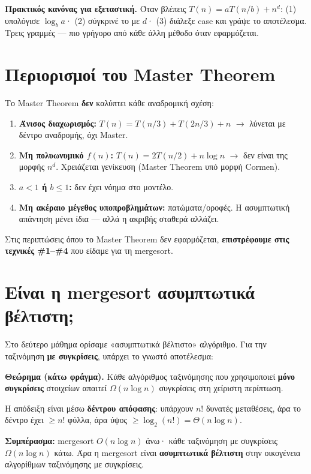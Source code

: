 \documentclass[11pt,a4paper]{article}
\begin{document}
\begin{keypoint}
\textbf{Πρακτικός κανόνας για εξεταστική.} Όταν βλέπεις $T(n) = a T(n/b) + n^d$:
(1) υπολόγισε $\log_b a$· (2) σύγκρινέ το με $d$· (3) διάλεξε case και γράψε το
αποτέλεσμα. Τρεις γραμμές --- πιο γρήγορο από κάθε άλλη μέθοδο όταν εφαρμόζεται.
\end{keypoint}

\section{Περιορισμοί του Master Theorem}

Το Master Theorem \textbf{δεν} καλύπτει κάθε αναδρομική σχέση:
\begin{enumerate}
  \item \textbf{Άνισος διαχωρισμός:} $T(n) = T(n/3) + T(2n/3) + n$ $\to$ λύνεται
  με δέντρο αναδρομής, όχι Master.
  \item \textbf{Μη πολυωνυμικό $f(n)$:} $T(n) = 2T(n/2) + n \log n$ $\to$ δεν
  είναι της μορφής $n^d$. Χρειάζεται γενίκευση (Master Theorem υπό μορφή Cormen).
  \item \textbf{$a < 1$ ή $b \le 1$:} δεν έχει νόημα στο μοντέλο.
  \item \textbf{Μη ακέραιο μέγεθος υποπροβλημάτων:} πατώματα/οροφές. Η
  ασυμπτωτική απάντηση μένει ίδια --- αλλά η ακριβής σταθερά αλλάζει.
\end{enumerate}
Στις περιπτώσεις όπου το Master Theorem δεν εφαρμόζεται, \textbf{επιστρέφουμε στις
τεχνικές \#1--\#4} που είδαμε για τη mergesort.

\section{Είναι η mergesort ασυμπτωτικά βέλτιστη;}

Στο δεύτερο μάθημα ορίσαμε «ασυμπτωτικά βέλτιστο» αλγόριθμο. Για την ταξινόμηση
\textbf{με συγκρίσεις}, υπάρχει το γνωστό αποτέλεσμα:

\begin{quoteblock}
\textbf{Θεώρημα (κάτω φράγμα).} Κάθε αλγόριθμος ταξινόμησης που χρησιμοποιεί
\textbf{μόνο συγκρίσεις} στοιχείων απαιτεί $\Omega(n \log n)$ συγκρίσεις στη
χείριστη περίπτωση.
\end{quoteblock}

Η απόδειξη είναι μέσω \textbf{δέντρου απόφασης}: υπάρχουν $n!$ δυνατές
μεταθέσεις, άρα το δέντρο έχει $\ge n!$ φύλλα, άρα ύψος $\ge \log_2(n!) =
\Theta(n \log n)$.

\textbf{Συμπέρασμα:} mergesort $O(n \log n)$ άνω· κάθε ταξινόμηση με συγκρίσεις
$\Omega(n \log n)$ κάτω. Άρα η mergesort είναι \textbf{ασυμπτωτικά βέλτιστη} στην
οικογένεια αλγορίθμων ταξινόμησης με συγκρίσεις.
\end{document}
